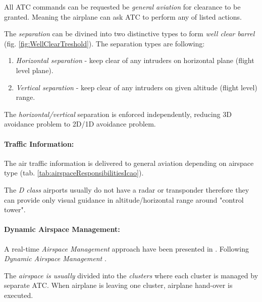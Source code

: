 \begin{note}
    All ATC commands can be requested be \emph{general aviation} for clearance to be granted. Meaning the airplane can ask ATC to perform any of listed actions. 
\end{note}

The \emph{separation} can be divined into two distinctive types to form \emph{well clear barrel} (fig. \ref{fig:WellClearTreshold}). The separation types are following:

\begin{enumerate}
    \item \emph{Horizontal separation} - keep clear of any intruders on horizontal plane (flight level plane).
    
    \item \emph{Vertical separation} - keep clear of any intruders on given altitude (flight level) range.
\end{enumerate}

\begin{note}
    The \emph{horizontal/vertical} separation is enforced independently, reducing 3D avoidance problem to 2D/1D avoidance problem.
\end{note}

\paragraph{Traffic Information:} The air traffic information is delivered to general aviation depending on airspace type (tab. \ref{tab:airspaceResponsibilitiesIcao}). 

\begin{note}
    The \emph{D class} airports usually do not have a radar or transponder therefore they can provide only visual guidance in altitude/horizontal range around "control tower".
\end{note}


\paragraph{Dynamic Airspace Management:} A real-time \emph{Airspace Management} approach have been presented in \cite{gardi2014real}. Following \emph{Dynamic Airspace Management} \cite{gerdes2016dynamic}. 

The \emph{airspace is usually} divided into the \emph{clusters} where each cluster is managed by separate ATC. When airplane is leaving one cluster, airplane hand-over is executed.

